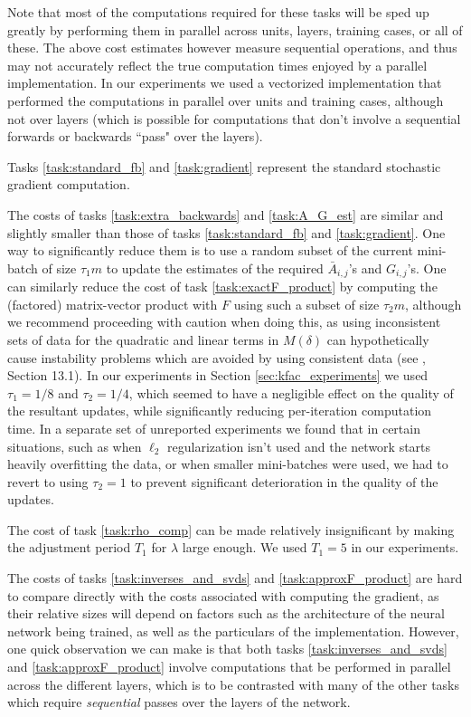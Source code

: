 \documentclass[12pt]{article}
\begin{document}
Note that most of the computations required for these tasks will be sped up greatly by performing them in parallel across units, layers, training cases, or all of these.  The above cost estimates however measure sequential operations, and thus may not accurately reflect the true computation times enjoyed by a parallel implementation.  In our experiments we used a vectorized implementation that performed the computations in parallel over units and training cases, although not over layers (which is possible for computations that don't involve a sequential forwards or backwards ``pass" over the layers).

Tasks \ref{task:standard_fb} and \ref{task:gradient} represent the standard stochastic gradient computation.

The costs of tasks \ref{task:extra_backwards} and \ref{task:A_G_est} are similar and slightly smaller than those of tasks \ref{task:standard_fb} and \ref{task:gradient}.  One way to significantly reduce them is to use a random subset of the current mini-batch of size $\tau_1 m$ to update the estimates of the required $\bar{A}_{i,j}$'s and $G_{i,j}$'s.  One can similarly reduce the cost of task \ref{task:exactF_product} by computing the (factored) matrix-vector product with $F$ using such a subset of size $\tau_2 m$, although we recommend proceeding with caution when doing this, as using inconsistent sets of data for the quadratic and linear terms in $M(\delta)$ can hypothetically cause instability problems which are avoided by using consistent data (see \citet{HF_chapter}, Section 13.1).  In our experiments in Section \ref{sec:kfac_experiments} we used $\tau_1 = 1/8$ and $\tau_2 = 1/4$, which seemed to have a negligible effect on the quality of the resultant updates, while significantly reducing per-iteration computation time.  In a separate set of unreported experiments we found that in certain situations, such as when $\ell_2$ regularization isn't used and the network starts heavily overfitting the data, or when smaller mini-batches were used, we had to revert to using $\tau_2 = 1$ to prevent significant deterioration in the quality of the updates.

The cost of task \ref{task:rho_comp} can be made relatively insignificant by making the adjustment period $T_1$ for $\lambda$ large enough.  We used $T_1 = 5$ in our experiments.


The costs of tasks \ref{task:inverses_and_svds} and \ref{task:approxF_product} are hard to compare directly with the costs associated with computing the gradient, as their relative sizes will depend on factors such as the architecture of the neural network being trained, as well as the particulars of the implementation.  However, one quick observation we can make is that both tasks \ref{task:inverses_and_svds} and \ref{task:approxF_product} involve computations that be performed in parallel across the different layers, which is to be contrasted with many of the other tasks which require \emph{sequential} passes over the layers of the network.  
\end{document}
